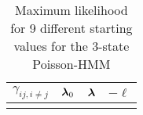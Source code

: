\begin{table}[ht]
    \centering
    \begin{tabular}{cccc}
        $\gamma_{ij, i\neq j}$ & $\boldsymbol{\lambda}_0$ & $\boldsymbol{\lambda}$ & $-\ell$ \\\hline
        }
    \end{tabular}
    \caption{Maximum likelihood for 9 different starting values for the 3-state Poisson-HMM}
    \label{tbl:3-state-fits}
\end{table}

\pagebreak

\nocite{*}




